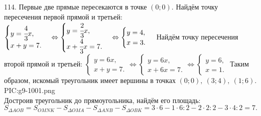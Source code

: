 114. Первые две прямые пересекаются в точке $(0;0).$ Найдём точку пересечения первой прямой и третьей: $\begin{cases}y=\cfrac{4}{3}x,\\ x+y=7.\end{cases}
\Leftrightarrow \begin{cases}y=\cfrac{2}{3}x,\\ x+\cfrac{4}{3}x=7.\end{cases}
\Leftrightarrow \begin{cases}y=4,\\ x=3.\end{cases}$ Найдём точку пересечения второй прямой и третьей: $\begin{cases}y=6x,\\ x+y=7.\end{cases}
\Leftrightarrow \begin{cases}y=6x,\\ x+6x=7.\end{cases}
\Leftrightarrow \begin{cases}y=6,\\ x=1.\end{cases}$ Таким образом, искомый треугольник имеет вершины в точках $(0;0),\ (3;4),\ (1;6).$\\
{{PIC:g9-1001.png}}\\
Достроив треугольник до прямоугольника, найдём его площадь: $S_{\Delta AOB}=S_{OMNK}-S_{\Delta OMA}-S_{\Delta ANB}-S_{\Delta OBK}=
3\cdot6-1\cdot6:2-2\cdot2:2-3\cdot4:2=7.$\\
